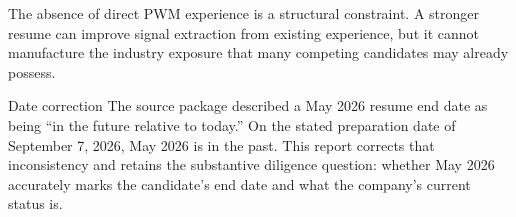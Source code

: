 \documentclass{reportkit}
\begin{document}
The absence of direct PWM experience is a structural constraint. A stronger resume can improve signal extraction from existing experience, but it cannot manufacture the industry exposure that many competing candidates may already possess.

\begin{limitationnote}{Date correction}
The source package described a May 2026 resume end date as being ``in the future relative to today.'' On the stated preparation date of September 7, 2026, May 2026 is in the past. This report corrects that inconsistency and retains the substantive diligence question: whether May 2026 accurately marks the candidate's end date and what the company's current status is.
\end{limitationnote}
\end{document}
